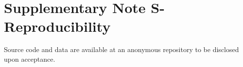 
\section*{Supplementary Note S-Reproducibility}
\label{supp:reproducibility}

Source code and data are available at an anonymous repository to be disclosed upon acceptance.
